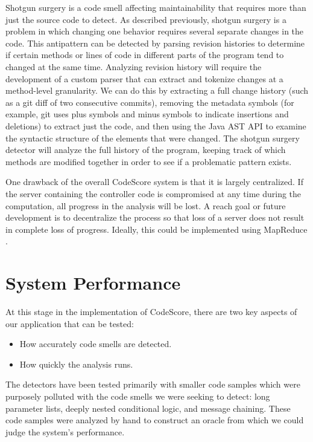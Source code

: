 \documentclass{sig-alternate}
\begin{document}
Shotgun surgery is a code smell affecting maintainability that requires more
than just the source code to detect. As described previously, shotgun surgery is
a problem in which changing one behavior requires several separate changes in
the code.  This antipattern can be detected by parsing revision histories to
determine if certain methods or lines of code in different parts of the program
tend to changed at the same time. Analyzing revision history will require the development 
of a custom parser that can extract and tokenize changes at a method-level
granularity. We can do this by extracting a full change history (such as a git
diff of two consecutive commits), removing the metadata symbols (for example, git uses plus
symbols and minus symbols to indicate insertions and deletions) to extract just
the code, and then using the Java AST API to examine the syntactic structure of
the elements that were changed. The shotgun surgery detector will analyze the
full history of the program, keeping track of which methods are modified
together in order to see if a problematic pattern exists.

One drawback of the overall CodeScore system is that it is largely centralized.
If the server containing the controller code is compromised at any time during
the computation, all progress in the analysis will be lost. A reach goal or
future development is to decentralize the process so that loss of a server does
not result in complete loss of progress. Ideally, this could be implemented
using MapReduce \cite{dean2008mapreduce}.

\section{System Performance}
At this stage in the implementation of CodeScore, there are two key aspects of
our application that can be tested:

\begin{itemize}
	\item How accurately code smells are detected.
	\item How quickly the analysis runs.
\end{itemize}

The detectors have been tested primarily with smaller code samples which were purposely
polluted with the code smells we were seeking to detect: long parameter lists,
deeply nested conditional logic, and message chaining. These code samples were
analyzed by hand to construct an oracle from which we could judge the system's performance.
\end{document}
